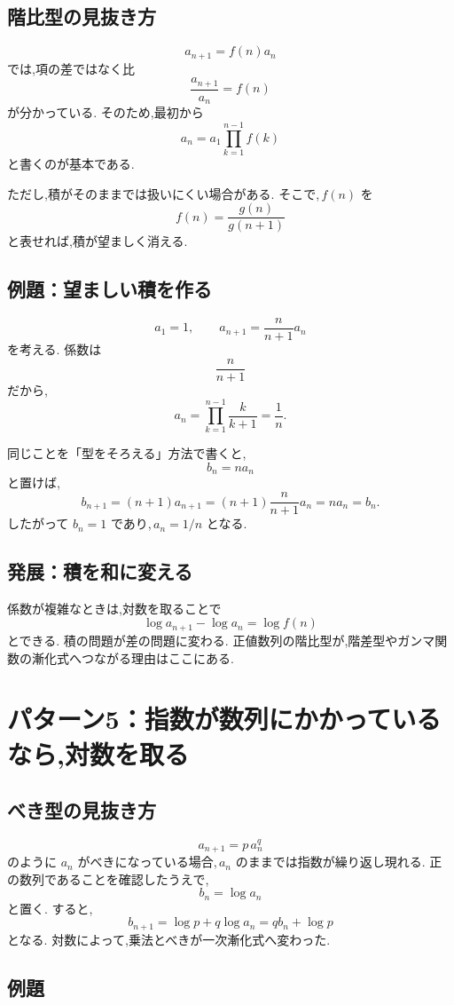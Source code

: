 \subsection{階比型の見抜き方}

\[
  a_{n+1}=f(n)a_n
\]
では,項の差ではなく比
\[
  \frac{a_{n+1}}{a_n}=f(n)
\]
が分かっている.
そのため,最初から
\[
  a_n=a_1\prod_{k=1}^{n-1}f(k)
\]
と書くのが基本である.

ただし,積がそのままでは扱いにくい場合がある.
そこで,\,$f(n)$ を
\[
  f(n)=\frac{g(n)}{g(n+1)}
\]
と表せれば,積が望ましく消える.

\subsection{例題：望ましい積を作る}

\[
  a_1=1,\qquad
  a_{n+1}=\frac{n}{n+1}a_n
\]
を考える.
係数は
\[
  \frac{n}{n+1}
\]
だから,
\[
  a_n
  =\prod_{k=1}^{n-1}\frac{k}{k+1}
  =\frac1n.
\]

同じことを「型をそろえる」方法で書くと,
\[
  b_n=na_n
\]
と置けば,
\[
  b_{n+1}
  =(n+1)a_{n+1}
  =(n+1)\frac{n}{n+1}a_n
  =na_n=b_n.
\]
したがって $b_n=1$ であり,\,$a_n=1/n$ となる.

\subsection{発展：積を和に変える}

係数が複雑なときは,対数を取ることで
\[
  \log a_{n+1}-\log a_n=\log f(n)
\]
とできる.
積の問題が差の問題に変わる.
正値数列の階比型が,階差型やガンマ関数の漸化式へつながる理由はここにある.

\section{パターン5：指数が数列にかかっているなら,対数を取る}

\subsection{べき型の見抜き方}

\[
  a_{n+1}=p\,a_n^q
\]
のように $a_n$ がべきになっている場合,\,$a_n$ のままでは指数が繰り返し現れる.
正の数列であることを確認したうえで,
\[
  b_n=\log a_n
\]
と置く.
すると,
\[
  b_{n+1}
  =\log p+q\log a_n
  =q b_n+\log p
\]
となる.
対数によって,乗法とべきが一次漸化式へ変わった.

\subsection{例題}

